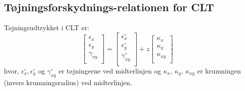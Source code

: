 \subsection{Tøjningsforskydnings-relationen for CLT}
Tøjningsudtrykket i CLT er:
\begin{equation} \label{eq:tøjningsforskydningsclt}
  \begin{bmatrix}
    \epsilon_x\\
  \epsilon_y\\
  \gamma_{xy}\\
  \end{bmatrix} = \begin{bmatrix}
    \epsilon_{x}^{\circ}\\
  \epsilon_{y}^{\circ}\\
  \gamma_{xy}^{\circ}\\
  \end{bmatrix} + z \begin{bmatrix}
    \kappa_{x}\\
  \kappa_y\\
  \kappa_{xy}\\
  \end{bmatrix}
\end{equation}
hvor, $\epsilon_{x}^{\circ}, \epsilon_y^{\circ}$ og $\gamma_{xy}^{\circ}$ er tøjningerne ved midterlinjen og $\kappa_x$, $\kappa_y$, $\kappa_{xy}$ er krumningen (invers krumningsradius) ved midterlinjen.


